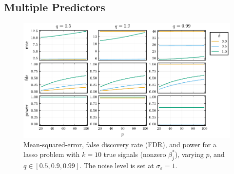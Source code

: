 \subsection{Multiple Predictors}

\begin{figure}[htpb]
  \centering
  \includegraphics[]{plots/beta-bias-multidim.pdf}
  \caption{%
    Mean-squared-error, false discovery rate (FDR), and power for a lasso problem with
    \(k = 10\) true signals (nonzero \(\beta_j^*\)), varying \(p\), and \(q \in [0.5, 0.9, 0.99]\). The noise level is set at \(\sigma_\varepsilon = 1\).
  }
  \label{fig:mse-fdr-power-multidim}
\end{figure}
